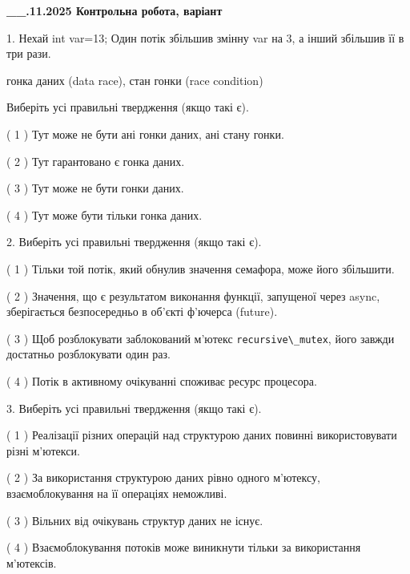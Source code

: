 \documentclass[12pt, ukrainian]{article}
\def\code#1{\Verb!#1!}
\begin{document}
\newpage
\begin {large}

\textbf{\_\_.11.2025 Контрольна робота, варіант  }\par


{
1. Нехай int var=13; Один потік збільшив змінну var на 3, а інший збільшив її в три рази.

гонка даних (data race), стан гонки (race condition)

Виберіть усі правильні твердження (якщо такі є).\par
\vspace{2mm}
( 1 ) Тут може не бути ані гонки даних, ані стану гонки.%

( 2 ) Тут гарантовано є гонка даних.%

( 3 ) Тут може не бути гонки даних.%

( 4 ) Тут може бути тільки гонка даних.%


2. Виберіть усі правильні твердження (якщо такі є).\par
\vspace{2mm}

( 1 ) Тільки той потік, який обнулив значення семафора, може його збільшити.%

( 2 ) Значення, що є результатом виконання функції, запущеної через async, зберігається безпосередньо в об’єкті ф’ючерса (future).%

( 3 ) Щоб розблокувати заблокований м’ютекс \code{recursive\_mutex}, його завжди достатньо розблокувати один раз.%

( 4 ) Потік в активному очікуванні споживає ресурс процесора.%


3. Виберіть усі правильні твердження (якщо такі є).\par
\vspace{2mm}

( 1 ) Реалізації різних операцій над структурою даних повинні використовувати різні м’ютекси.%

( 2 ) За використання структурою даних рівно одного м’ютексу, взаємоблокування на її операціях неможливі.%

( 3 ) Вільних від очікувань структур даних не існує.%

( 4 ) Взаємоблокування потоків може виникнути тільки за використання м’ютексів.%


}
\end{large}
\end{document}
